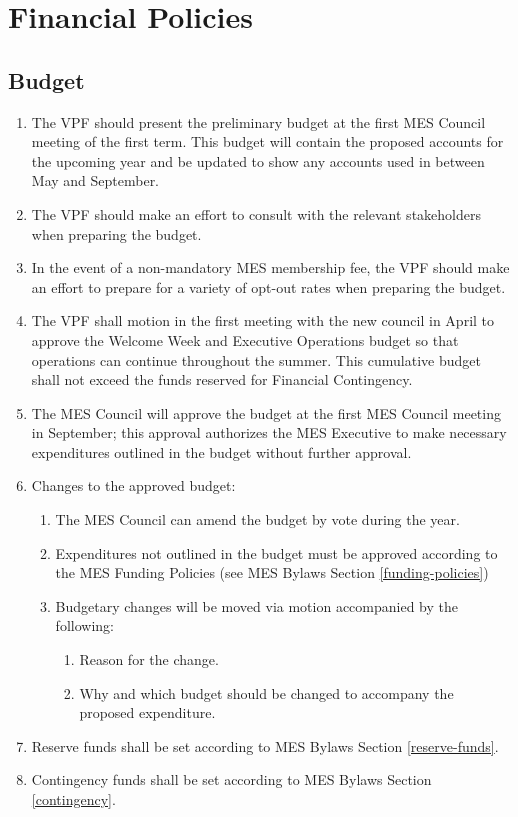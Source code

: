 \section{Financial Policies}
\label{financial-policies}

\subsection{Budget}
\label{budget}
\begin{enumerate}
 \item
  The VPF should present the preliminary budget at the first MES Council meeting of the first term. This budget will contain the proposed accounts for the upcoming year and be updated to show any accounts used in between May and September.
 \item
  The VPF should make an effort to consult with the relevant stakeholders when preparing the budget.
 \item
  In the event of a non-mandatory MES membership fee, the VPF should make an effort to prepare for a variety of opt-out rates when preparing the budget.
 \item
  The VPF shall motion in the first meeting with the new council in April to approve the Welcome Week and Executive Operations budget so that operations can continue throughout the summer. This cumulative budget shall not exceed the funds reserved for Financial Contingency.
 \item
  The MES Council will approve the budget at the first MES Council meeting in September; this approval authorizes the MES Executive to make necessary expenditures outlined in the budget without further approval.
 \item
  Changes to the approved budget:

  \begin{enumerate}
   \item
    The MES Council can amend the budget by vote during the year.
   \item
    Expenditures not outlined in the budget must be approved according to the MES Funding Policies (see MES Bylaws Section \ref{funding-policies})
   \item
    Budgetary changes will be moved via motion accompanied by the following:

    \begin{enumerate}
     \item
      Reason for the change.
     \item
      Why and which budget should be changed to accompany the proposed expenditure.
    \end{enumerate}
  \end{enumerate}
 \item
  Reserve funds shall be set according to MES Bylaws Section \ref{reserve-funds}.
 \item
  Contingency funds shall be set according to MES Bylaws Section \ref{contingency}.

\end{enumerate}

